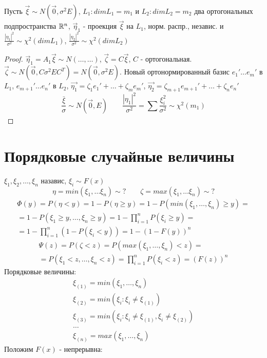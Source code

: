 \documentclass{article}
\begin{document}
\begin{theorem}[О проекции]
  Пусть $\vec{\xi}\sim N(\vec{0},\sigma^{2}E)$, $L_1:dimL_1=m_1$ и $L_2:dimL_2=m_2$ два
  ортогональных подпространства $\mathbb{R}^{n}$, $\vec{\eta}_1$ - проекция $\vec{\xi}$ на $L_1$,
  норм. распр., независ. и $\frac{|\eta_1|^{2}}{\sigma^{2}}\sim\chi^{2}(dimL_1)$,
  $\frac{|\eta_2|^{2}}{\sigma^{2}}\sim\chi^{2}(dimL_2)$
\end{theorem}
\begin{proof}
  $\vec{\eta}_1=A_1\vec{\xi}\sim N(\dots,\dots )$, $\vec{\zeta}=C\vec{\xi}$,
  $C$ - ортогональная. $\vec{\zeta}\sim N(\vec{0},C\sigma^{2}EC^{T})=N(\vec{0},\sigma^{2}E)$.
  Новый ортонормированный базис $e_1'\dots e_{m}'$ в $L_1$, 
  $e_{m+1}'\dots e_{n}'$ в $L_2$, $\vec{\eta_1}=\zeta_1e_1'+\dots +\zeta_{m}e_{m}'$,
  $\vec{\eta_2}=\zeta_{m+1}e_{m+1}'+\dots +\zeta_{n}e_{n}'$
\[
  \frac{\bar{\xi}}{\sigma}\sim N(\vec{0},E) \qquad \frac{|\eta_1|^{2}}{\sigma^{2}}=\sum_{}^{}\frac{\xi_i^{2}}{\sigma^{2}}\sim \chi^{2}(m_1)
\]
\end{proof}

 
\section{Порядковые случайные величины}
$\xi_1,\xi_2,\dots ,\xi_n$ назавис, $\xi_i \sim F(x)$
\[
  \eta=min(\xi_1,\dots \xi_n) \sim ? \qquad
  \zeta=max(\xi_1,\dots \xi_n) \sim ? 
\]
\begin{gather*}
  \Phi(y)=P(\eta<y)=1-P(\eta \ge y)=1-P(min(\xi_1,\dots ,\xi_n) \ge y)= \\ 
  =1-P(\xi_1\ge y,\dots ,\xi_n \ge y) = 1 - \prod_{i=1}^{n}P(\xi_i \ge y)= \\ 
  =1 - \prod_{i=1}^{n}(1-P(\xi_i < y))=1-(1-F(y))^{n}
\end{gather*}
\begin{gather*}
  \Psi(z)=P(\zeta<z)=P(max(\xi_1,\dots ,\xi_n) < z)= \\ 
  = P(\xi_1 < z, \dots , \xi_n<z)=\prod_{i=1}^{n}P(\xi_i < z)=(F(z))^{n}
\end{gather*}
Порядковые величины:
\begin{gather*}
  \xi_{(1)}=min(\xi_1, \dots , \xi_n) \\
  \xi_{(2)}=min(\xi_i:\xi_i\neq \xi_{(1)}) \\
  \xi_{(3)}=min(\xi_i:\xi_i\neq \xi_{(1)}, \xi_i \neq \xi_{(2)}) \\
  \dots \\ 
  \xi_{(n)}=max(\xi_1, \dots , \xi_n)
\end{gather*}
Положим $F(x)$ - непрерывна:
\end{document}
